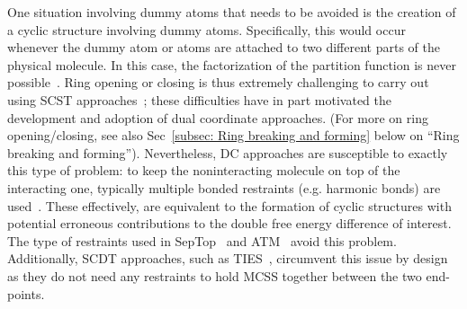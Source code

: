 \documentclass[9pt,bestpractices]{livecoms}
\begin{document}
One situation involving dummy atoms that needs to be avoided is the creation of a cyclic structure involving dummy atoms.  Specifically, this would occur whenever the dummy atom or atoms are attached to two different parts of the physical molecule. In this case, the factorization of the partition function is never possible~\cite{Shobana_2000}. Ring opening or closing is thus extremely challenging to carry out using SCST approaches~\cite{liu2015ring}; these difficulties have in part motivated the development and adoption of dual coordinate approaches. (For more on ring opening/closing, see also Sec~\ref{subsec: Ring breaking and forming} below on ``Ring breaking and forming''). Nevertheless, DC approaches are susceptible to exactly this type of problem: to keep the noninteracting molecule on top of the interacting one, typically multiple bonded restraints (e.g. harmonic bonds) are used~\cite{Axelsen_1998,Ries_2022}. These effectively, are equivalent to the formation of cyclic structures with potential erroneous contributions to the double free energy difference of interest. The type of restraints used in SepTop~\cite{rocklin2013separated,Baumann_2023} and ATM~\cite{azimi2022relative} avoid this problem.
Additionally, SCDT approaches, such as TIES~\cite{bhati2017}, circumvent this issue by design as they do not need any restraints to hold MCSS together between the two end-points.
\end{document}
